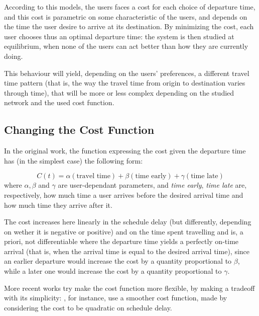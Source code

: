 According to this models, the users faces a cost for each choice of departure time,
and this cost is parametric on some characteristic of the users,
and depends on the time the user desire to arrive at its destination.
By minimizing the cost, each user chooses thus an optimal departure time:
the system is then studied at equilibrium, when none of the users can act better than how they are currently doing.

This behaviour will yield, depending on the users' preferences,
a different travel time pattern (that is, the way the travel time from origin to destination varies through time),
that will be more or less complex depending on the studied network and the used cost function.

\subsection{Changing the Cost Function}

In the original work, the function expressing the cost given the departure time has (in the simplest case) the following form:

\begin{equation}
  \label{eq:cost_intro}
  C(t) = \alpha(\text{travel time}) + \beta (\text{time early}) + \gamma (\text{time late})
\end{equation}
where \(\alpha, \beta\) and \(\gamma\) are user-dependant parameters, and \textit{time early}, \textit{time late} are, respectively, how much time a user arrives before the desired arrival time and how much time they arrive after it.

The cost increases here linearly in the schedule delay (but differently, depending on wether it is negative or positive) and on the time spent travelling and is, a priori, not differentiable where the departure time yields a perfectly on-time arrival
(that is, when the arrival time is equal to the desired arrival time),
since an earlier departure would increase the cost by a quantity proportional to \(\beta\),
while a later one would increase the cost by a quantity proportional to \(\gamma\).

More recent works try make the cost function more flexible,
by making a tradeoff with its simplicity:
, for instance,
use a smoother cost function, made by considering the cost to be quadratic on schedule delay. 

